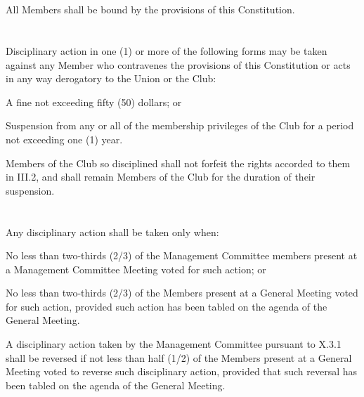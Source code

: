 
\section{}
All Members shall be bound by the provisions of this Constitution.

\section{}
Disciplinary action in one (1) or more of the following forms may be taken against any Member who contravenes the provisions of this Constitution or acts in any way derogatory to the Union or the Club:
	\begin{legal}
	\item A fine not exceeding fifty (50) dollars; or
	\item Suspension from any or all of the membership privileges of the Club for a period not exceeding one (1) year.
		\begin{legal}
		\item Members of the Club so disciplined shall not forfeit the rights accorded to them in III.2, and shall remain Members of the Club for the duration of their suspension.
		\end{legal}
	\end{legal}

\section{}
Any disciplinary action shall be taken only when:
	\begin{legal}
	\item No less than two-thirds (2/3) of the Management Committee members present at a Management Committee Meeting voted for such action; or
	\item No less than two-thirds (2/3) of the Members present at a General Meeting voted for such action, provided such action has been tabled on the agenda of the General Meeting.
	\item A disciplinary action taken by the Management Committee pursuant to X.3.1 shall be reversed if not less than half (1/2) of the Members present at a General Meeting voted to reverse such disciplinary action, provided that such reversal has been tabled on the agenda of the General Meeting.
	\end{legal}